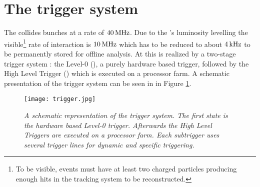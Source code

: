 \section{The trigger system}
The \lhc collides bunches at a rate of $40 {\rm \,MHz}$. Due to the \lhcb's luminosity levelling the visible\footnote{To be visible, events must have at least two charged particles producing enough hits in the tracking system to be reconstructed.} rate of interaction is $10{\rm \,MHz}$ which has to be reduced to about $4{\rm \,kHz}$ to be permanently stored for offline analysis. At \lhcb this is realized by a two-stage trigger system \cite{trigger} \cite{trigger2}: the Level-0 (\lone), a purely hardware based trigger, followed by the High Level Trigger (\hlt) which is executed on a processor farm. A schematic presentation of the trigger system can be seen in in Figure \ref{fig:trigger}.
\begin{figure}[ht]
\vspace*{-0.3cm}
  \begin{center}
    \texttt{[image: trigger.jpg]}
  \vspace*{-0.5cm}
  \end{center}
  \caption{\textit{A schematic representation of the \lhcb trigger system. The first state is the hardware based Level-0 trigger. Afterwards the High Level Triggers are executed on a processor farm. Each subtrigger uses several trigger lines for dynamic and specific triggering.}}
  \label{fig:trigger}
\end{figure}


